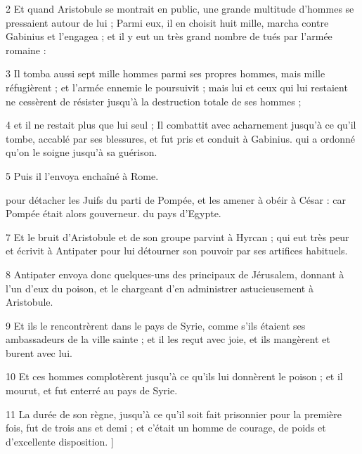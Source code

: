 \par 2 Et quand Aristobule se montrait en public, une grande multitude d'hommes se pressaient autour de lui ; Parmi eux, il en choisit huit mille, marcha contre Gabinius et l'engagea ; et il y eut un très grand nombre de tués par l'armée romaine :

\par 3 Il tomba aussi sept mille hommes parmi ses propres hommes, mais mille réfugièrent ; et l'armée ennemie le poursuivit ; mais lui et ceux qui lui restaient ne cessèrent de résister jusqu'à la destruction totale de ses hommes ;

\par 4 et il ne restait plus que lui seul ; Il combattit avec acharnement jusqu'à ce qu'il tombe, accablé par ses blessures, et fut pris et conduit à Gabinius. qui a ordonné qu'on le soigne jusqu'à sa guérison.

\par 5 Puis il l'envoya enchaîné à Rome.

\par [Et il resta enfermé en prison jusqu'au règne de César ; qui l'a fait sortir de prison et l'a comblé de cadeaux et de faveurs ;

\par 6 et lui donnant deux généraux et douze mille hommes, il l'envoya dans le pays de Juda, [BC 49.] pour détacher les Juifs du parti de Pompée, et les amener à obéir à César : car Pompée était alors gouverneur. du pays d'Egypte.

\par 7 Et le bruit d'Aristobule et de son groupe parvint à Hyrcan ; qui eut très peur et écrivit à Antipater pour lui détourner son pouvoir par ses artifices habituels.

\par 8 Antipater envoya donc quelques-uns des principaux de Jérusalem, donnant à l'un d'eux du poison, et le chargeant d'en administrer astucieusement à Aristobule.

\par 9 Et ils le rencontrèrent dans le pays de Syrie, comme s'ils étaient ses ambassadeurs de la ville sainte ; et il les reçut avec joie, et ils mangèrent et burent avec lui.

\par 10 Et ces hommes complotèrent jusqu'à ce qu'ils lui donnèrent le poison ; et il mourut, et fut enterré au pays de Syrie.

\par 11 La durée de son règne, jusqu'à ce qu'il soit fait prisonnier pour la première fois, fut de trois ans et demi ; et c'était un homme de courage, de poids et d'excellente disposition. ]

